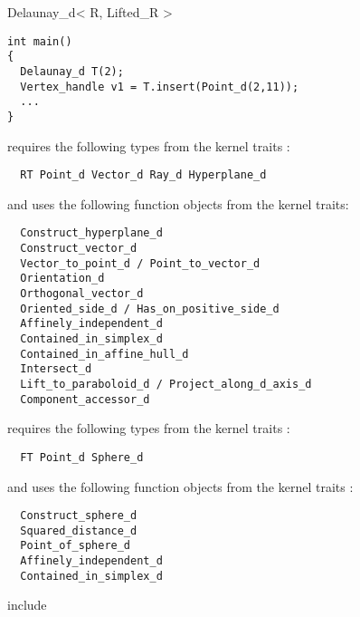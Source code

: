 \begin{ccRefClass}{Delaunay_d< R, Lifted_R >}
\begin{verbatim}
int main()
{
  Delaunay_d T(2);
  Vertex_handle v1 = T.insert(Point_d(2,11));
  ...
}
\end{verbatim}
 




 requires the following types from the kernel traits :
\begin{verbatim}
  RT Point_d Vector_d Ray_d Hyperplane_d 
\end{verbatim}
and uses the following function objects from the kernel traits:
\begin{verbatim}
  Construct_hyperplane_d
  Construct_vector_d
  Vector_to_point_d / Point_to_vector_d
  Orientation_d
  Orthogonal_vector_d
  Oriented_side_d / Has_on_positive_side_d
  Affinely_independent_d
  Contained_in_simplex_d
  Contained_in_affine_hull_d
  Intersect_d
  Lift_to_paraboloid_d / Project_along_d_axis_d
  Component_accessor_d
\end{verbatim}
 requires the following types from the kernel traits :
\begin{verbatim}
  FT Point_d Sphere_d 
\end{verbatim}
and uses the following function objects from the kernel traits :
\begin{verbatim}
  Construct_sphere_d
  Squared_distance_d
  Point_of_sphere_d
  Affinely_independent_d
  Contained_in_simplex_d
\end{verbatim}
 



include 



\end{ccRefClass}
